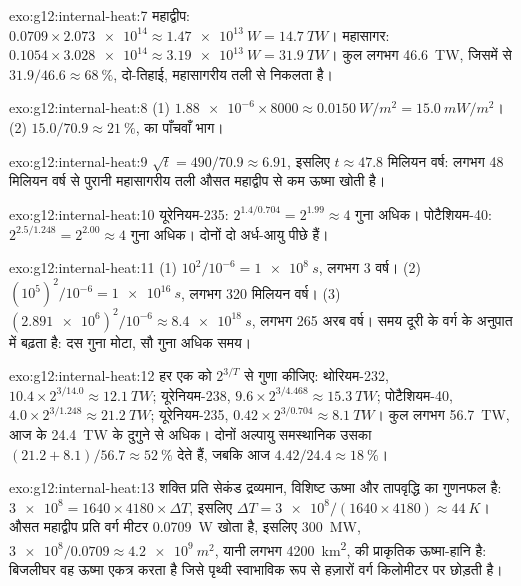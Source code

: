 \begin{solution}{exo:g12:internal-heat:7}
महाद्वीप: $0.0709 \times \num{2.073e14} \approx \qty{1.47e13}{W} =
\qty{14.7}{TW}$। महासागर: $0.1054 \times \num{3.028e14} \approx
\qty{3.19e13}{W} = \qty{31.9}{TW}$। कुल लगभग \qty{46.6}{TW}, जिसमें से
$31.9/46.6 \approx \qty{68}{\percent}$, दो-तिहाई, महासागरीय
तली से निकलता है।
\end{solution}

\begin{solution}{exo:g12:internal-heat:8}
(1) $\num{1.88e-6} \times 8000 \approx \qty{0.0150}{W/m^2} = \qty{15.0}{mW/m^2}$।
(2) $15.0/70.9 \approx \qty{21}{\percent}$,  का पाँचवाँ भाग।
\end{solution}

\begin{solution}{exo:g12:internal-heat:9}
$\sqrt{t} = 490/70.9 \approx 6.91$, इसलिए $t \approx 47.8$ मिलियन वर्ष: लगभग
48 मिलियन वर्ष से पुरानी महासागरीय तली औसत महाद्वीप से कम
ऊष्मा खोती है।
\end{solution}

\begin{solution}{exo:g12:internal-heat:10}
यूरेनियम-235: $2^{1.4/0.704} = 2^{1.99} \approx 4$ गुना अधिक। पोटैशियम-40:
$2^{2.5/1.248} = 2^{2.00} \approx 4$ गुना अधिक। दोनों दो अर्ध-आयु पीछे हैं।
\end{solution}

\begin{solution}{exo:g12:internal-heat:11}
(1) $10^2/10^{-6} = \qty{1e8}{s}$, लगभग 3 वर्ष। (2) $(10^5)^2/10^{-6} =
\qty{1e16}{s}$, लगभग 320 मिलियन वर्ष। (3) $(\num{2.891e6})^2/10^{-6}
\approx \qty{8.4e18}{s}$, लगभग 265 अरब वर्ष। समय दूरी के
वर्ग के अनुपात में बढ़ता है: दस गुना मोटा, सौ गुना अधिक समय।
\end{solution}

\begin{solution}{exo:g12:internal-heat:12}
हर एक को $2^{3/T}$ से गुणा कीजिए: थोरियम-232, $10.4 \times 2^{3/14.0} \approx
\qty{12.1}{TW}$; यूरेनियम-238, $9.6 \times 2^{3/4.468} \approx \qty{15.3}{TW}$;
पोटैशियम-40, $4.0 \times 2^{3/1.248} \approx \qty{21.2}{TW}$; यूरेनियम-235,
$0.42 \times 2^{3/0.704} \approx \qty{8.1}{TW}$। कुल लगभग \qty{56.7}{TW},
आज के \qty{24.4}{TW} के दुगुने से अधिक। दोनों अल्पायु समस्थानिक उसका
$(21.2 + 8.1)/56.7 \approx \qty{52}{\percent}$ देते हैं, जबकि
आज $4.42/24.4 \approx \qty{18}{\percent}$।
\end{solution}

\begin{solution}{exo:g12:internal-heat:13}
शक्ति प्रति सेकंड द्रव्यमान, विशिष्ट ऊष्मा और तापवृद्धि का
गुणनफल है: $\num{3e8} = 1640 \times 4180 \times \Delta T$, इसलिए $\Delta T =
\num{3e8}/(1640 \times 4180) \approx \qty{44}{K}$। औसत महाद्वीप प्रति वर्ग मीटर
\qty{0.0709}{W} खोता है, इसलिए \qty{300}{MW},
$\num{3e8}/0.0709 \approx \qty{4.2e9}{m^2}$, यानी लगभग \qty{4200}{km^2}, की प्राकृतिक ऊष्मा-हानि है:
बिजलीघर वह ऊष्मा एकत्र करता है जिसे पृथ्वी स्वाभाविक रूप से हज़ारों
वर्ग किलोमीटर पर छोड़ती है।
\end{solution}


